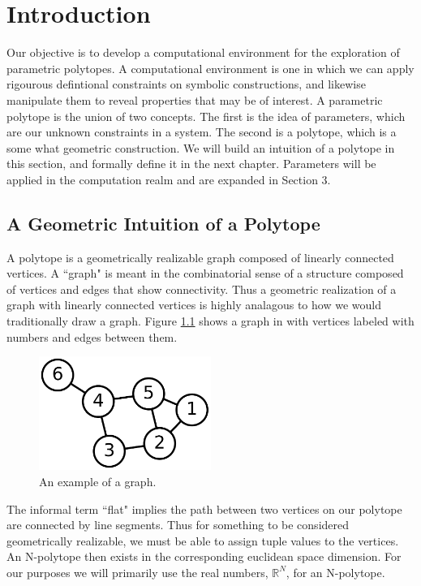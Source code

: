 \chapter{Introduction}

Our objective is to develop a computational environment for the exploration
of parametric polytopes. A computational environment is one in which
we can apply rigourous defintional constraints on symbolic constructions, and
likewise manipulate them to reveal properties that may be of interest.
A parametric polytope is the union of two concepts. The first is the idea
of parameters, which are our unknown constraints in a system. The second
is a polytope, which is a some what geometric construction. We will
build an intuition of a polytope in this section, and formally define it
in the next chapter. Parameters will be applied in the computation realm
and are expanded in Section 3.


\section{A Geometric Intuition of a Polytope}

A polytope is a geometrically realizable graph composed
of linearly connected vertices\cite{Coxeter}.
A ``graph" is meant in the combinatorial sense of a structure composed of
vertices and edges that show connectivity. Thus a geometric realization
of a graph with linearly connected vertices is highly analagous to how we would traditionally
draw a graph. Figure \ref{fig:graph} shows a graph in with vertices labeled
with numbers and edges between them.

\begin{figure}[h!]
  \centering
    \includegraphics[width=0.5\textwidth]{img/6graph.png}
  \caption{An example of a graph.}
  \label{fig:graph}
\end{figure}

The informal term ``flat" implies the path between two vertices
on our polytope are connected by line segments. Thus for something to be
considered geometrically realizable, we must be able to assign tuple values
to the vertices. An N-polytope then exists in the corresponding euclidean
space dimension. For our purposes we will primarily use the real numbers,
$\mathbb{R}^N$, for an N-polytope.

